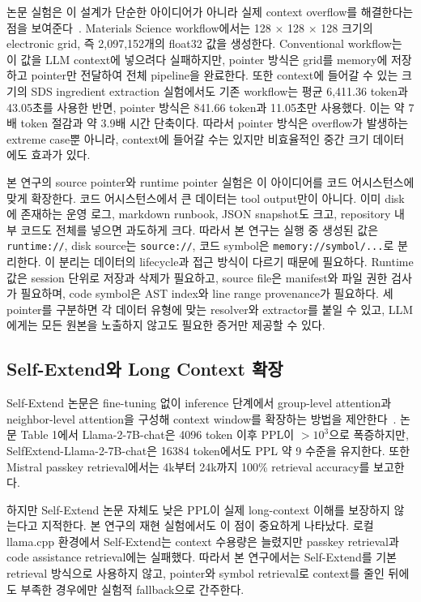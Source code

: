 \documentclass[11pt,a4paper]{article}
\begin{document}
논문 실험은 이 설계가 단순한 아이디어가 아니라 실제 context overflow를 해결한다는 점을 보여준다~\cite{labate2025contextoverflow}. Materials Science workflow에서는 128 $\times$ 128 $\times$ 128 크기의 electronic grid, 즉 2,097,152개의 float32 값을 생성한다. Conventional workflow는 이 값을 LLM context에 넣으려다 실패하지만, pointer 방식은 grid를 memory에 저장하고 pointer만 전달하여 전체 pipeline을 완료한다. 또한 context에 들어갈 수 있는 크기의 SDS ingredient extraction 실험에서도 기존 workflow는 평균 6,411.36 token과 43.05초를 사용한 반면, pointer 방식은 841.66 token과 11.05초만 사용했다. 이는 약 7배 token 절감과 약 3.9배 시간 단축이다. 따라서 pointer 방식은 overflow가 발생하는 extreme case뿐 아니라, context에 들어갈 수는 있지만 비효율적인 중간 크기 데이터에도 효과가 있다.

본 연구의 source pointer와 runtime pointer 실험은 이 아이디어를 코드 어시스턴스에 맞게 확장한다. 코드 어시스턴스에서 큰 데이터는 tool output만이 아니다. 이미 disk에 존재하는 운영 로그, markdown runbook, JSON snapshot도 크고, repository 내부 코드도 전체를 넣으면 과도하게 크다. 따라서 본 연구는 실행 중 생성된 값은 \texttt{runtime://}, disk source는 \texttt{source://}, 코드 symbol은 \texttt{memory://symbol/...}로 분리한다. 이 분리는 데이터의 lifecycle과 접근 방식이 다르기 때문에 필요하다. Runtime 값은 session 단위로 저장과 삭제가 필요하고, source file은 manifest와 파일 권한 검사가 필요하며, code symbol은 AST index와 line range provenance가 필요하다. 세 pointer를 구분하면 각 데이터 유형에 맞는 resolver와 extractor를 붙일 수 있고, LLM에게는 모든 원본을 노출하지 않고도 필요한 증거만 제공할 수 있다.

\subsection{Self-Extend와 Long Context 확장}

Self-Extend 논문은 fine-tuning 없이 inference 단계에서 group-level attention과 neighbor-level attention을 구성해 context window를 확장하는 방법을 제안한다~\cite{jin2024selfextend}. 논문 Table 1에서 Llama-2-7B-chat은 4096 token 이후 PPL이 $>10^3$으로 폭증하지만, SelfExtend-Llama-2-7B-chat은 16384 token에서도 PPL 약 9 수준을 유지한다. 또한 Mistral passkey retrieval에서는 4k부터 24k까지 100\% retrieval accuracy를 보고한다.

하지만 Self-Extend 논문 자체도 낮은 PPL이 실제 long-context 이해를 보장하지 않는다고 지적한다. 본 연구의 재현 실험에서도 이 점이 중요하게 나타났다. 로컬 llama.cpp 환경에서 Self-Extend는 context 수용량은 늘렸지만 passkey retrieval과 code assistance retrieval에는 실패했다. 따라서 본 연구에서는 Self-Extend를 기본 retrieval 방식으로 사용하지 않고, pointer와 symbol retrieval로 context를 줄인 뒤에도 부족한 경우에만 실험적 fallback으로 간주한다.
\end{document}
